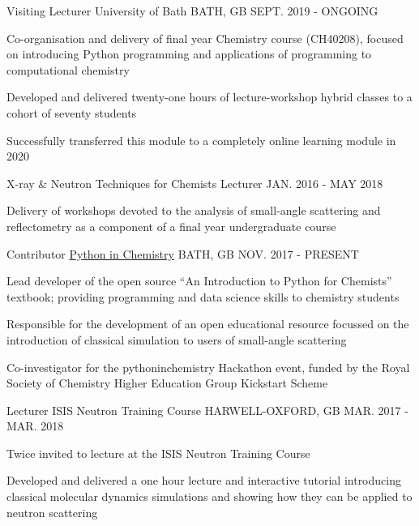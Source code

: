 \begin{cventries}
	\cventry
	{Visiting Lecturer}
	{University of Bath}
	{BATH, GB}
	{SEPT. 2019 - ONGOING}
	{
		\begin{cvitems}
			\item {Co-organisation and delivery of final year Chemistry course (CH40208), focused on introducing Python programming and applications of programming to computational chemistry}
			\item {Developed and delivered twenty-one hours of lecture-workshop hybrid classes to a cohort of seventy students}
			\item {Successfully transferred this module to a completely online learning module in 2020}
		\end{cvitems}
	}
	\cventry
	{X-ray \& Neutron Techniques for Chemists Lecturer}
	{}
	{}
	{JAN. 2016 - MAY 2018}
	{
		\begin{cvitems}
			\item {Delivery of workshops devoted to the analysis of small-angle scattering and reflectometry as a component of a final year undergraduate course}
		\end{cvitems}
	}
	\cventry
	{Contributor}
	{\href{https://pythoninchemistry.org}{Python in Chemistry}}
	{BATH, GB}
	{NOV. 2017 - PRESENT}
	{
		\begin{cvitems}
			\item {Lead developer of the open source ``An Introduction to Python for Chemists'' textbook; providing programming and data science skills to chemistry students}
			\item {Responsible for the development of an open educational resource focussed on the introduction of classical simulation to users of small-angle scattering}
			\item {Co-investigator for the pythoninchemistry Hackathon event, funded by the Royal Society of Chemistry Higher Education Group Kickstart Scheme}
		\end{cvitems}
	}
	\cventry
	{Lecturer}
	{ISIS Neutron Training Course}
	{HARWELL-OXFORD, GB}
	{MAR. 2017 - MAR. 2018}
	{
		\begin{cvitems}
			\item {Twice invited to lecture at the ISIS Neutron Training Course}
			\item {Developed and delivered a one hour lecture and interactive tutorial introducing classical molecular dynamics simulations and showing how they can be applied to neutron scattering}
		\end{cvitems}
	}
\end{cventries}

